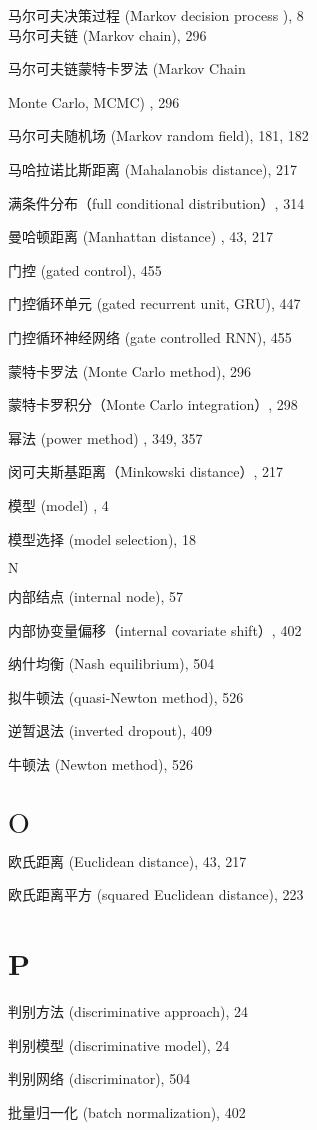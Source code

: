 \documentclass[10pt]{article}
\begin{document}
马尔可夫决策过程 (Markov decision process ), 8\\
马尔可夫链 (Markov chain), 296

马尔可夫链蒙特卡罗法 (Markov Chain

Monte Carlo, MCMC) , 296

马尔可夫随机场 (Markov random field), 181, 182

马哈拉诺比斯距离 (Mahalanobis distance), 217

满条件分布（full conditional distribution）, 314

曼哈顿距离 (Manhattan distance) , 43, 217

门控 (gated control), 455

门控循环单元 (gated recurrent unit, GRU), 447

门控循环神经网络 (gate controlled RNN), 455

蒙特卡罗法 (Monte Carlo method), 296

蒙特卡罗积分（Monte Carlo integration）, 298

幂法 (power method) , 349, 357

闵可夫斯基距离（Minkowski distance）, 217

模型 (model) , 4

模型选择 (model selection), 18

$\mathrm{N}$

内部结点 (internal node), 57

内部协变量偏移（internal covariate shift）, 402

纳什均衡 (Nash equilibrium), 504

拟牛顿法 (quasi-Newton method), 526

逆暂退法 (inverted dropout), 409

牛顿法 (Newton method), 526

\section*{$\mathrm{O}$}
欧氏距离 (Euclidean distance), 43, 217

欧氏距离平方 (squared Euclidean distance), 223

\section*{P}
判别方法 (discriminative approach), 24

判别模型 (discriminative model), 24

判别网络 (discriminator), 504

批量归一化 (batch normalization), 402
\end{document}
